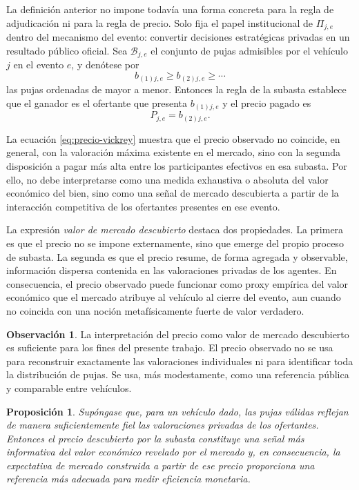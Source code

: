 \documentclass[11pt,a4paper]{article}
\newtheorem{proposicion}{Proposición}
\theoremstyle{definition}
\newtheorem{observacion}{Observación}
\begin{document}
La definición anterior no impone todavía una forma concreta para la regla de adjudicación ni para la regla de precio. Solo fija el papel institucional de $\Pi_{j,e}$ dentro del mecanismo del evento: convertir decisiones estratégicas privadas en un resultado público oficial.
Sea $\mathcal{B}_{j,e}$ el conjunto de pujas admisibles por el vehículo $j$ en el evento $e$, y denótese por
\[
b_{(1)j,e}\geq b_{(2)j,e}\geq \cdots
\]
las pujas ordenadas de mayor a menor. Entonces la regla de la subasta establece que el ganador es el ofertante que presenta $b_{(1)j,e}$ y el precio pagado es
\begin{equation}\label{eq:precio-vickrey}
P_{j,e}=b_{(2)j,e}.
\end{equation}

La ecuación \eqref{eq:precio-vickrey} muestra que el precio observado no coincide, en general, con la valoración máxima existente en el mercado, sino con la segunda disposición a pagar más alta entre los participantes efectivos en esa subasta. Por ello, no debe interpretarse como una medida exhaustiva o absoluta del valor económico del bien, sino como una señal de mercado descubierta a partir de la interacción competitiva de los ofertantes presentes en ese evento.

La expresión \emph{valor de mercado descubierto} destaca dos propiedades. La primera es que el precio no se impone externamente, sino que emerge del propio proceso de subasta. La segunda es que el precio resume, de forma agregada y observable, información dispersa contenida en las valoraciones privadas de los agentes. En consecuencia, el precio observado puede funcionar como proxy empírica del valor económico que el mercado atribuye al vehículo al cierre del evento, aun cuando no coincida con una noción metafísicamente fuerte de valor verdadero.

\begin{observacion}
La interpretación del precio como valor de mercado descubierto es suficiente para los fines del presente trabajo. El precio observado no se usa para reconstruir exactamente las valoraciones individuales ni para identificar toda la distribución de pujas. Se usa, más modestamente, como una referencia pública y comparable entre vehículos.
\end{observacion}

\begin{proposicion}\label{prop:senal-informativa}
Supóngase que, para un vehículo dado, las pujas válidas reflejan de manera suficientemente fiel las valoraciones privadas de los ofertantes. Entonces el precio descubierto por la subasta constituye una señal más informativa del valor económico revelado por el mercado y, en consecuencia, la expectativa de mercado construida a partir de ese precio proporciona una referencia más adecuada para medir eficiencia monetaria.
\end{proposicion}
\end{document}
